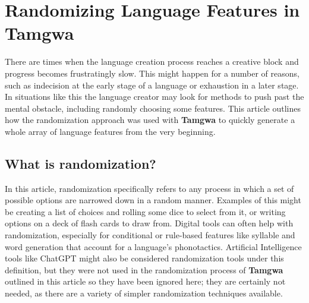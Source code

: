 \documentclass[a4paper,12pt,twoside,openright]{memoir}
\begin{document}


\chapter[Randomizing Language Features][Tamgwa]{Randomizing Language Features in Tamgwa}


\thispagestyle{fancy}
\BgUsetrue


    There are times when the language creation process reaches a creative block and progress becomes frustratingly slow.  This might happen for a number of reasons, such as indecision at the early stage of a language or exhaustion in a later stage.  In situations like this the language creator may look for methods to push past the mental obstacle, including randomly choosing some features.  This article outlines how the randomization approach was used with \textbf{Tamgwa} to quickly generate a whole array of language features from the very beginning.

\section*{What is randomization?} %

    In this article, randomization specifically refers to any process in which a set of possible options are narrowed down in a random manner.  Examples of this might be creating a list of choices and rolling some dice to select from it, or writing options on a deck of flash cards to draw from.  Digital tools can often help with randomization, especially for conditional or rule-based features like syllable and word generation that account for a language's phonotactics.  Artificial Intelligence tools like ChatGPT might also be considered randomization tools under this definition, but they were not used in the randomization process of \textbf{Tamgwa} outlined in this article so they have been ignored here; they are certainly not needed, as there are a variety of simpler randomization techniques available.
\end{document}

